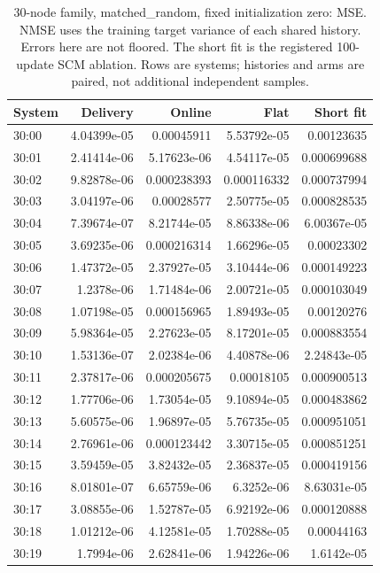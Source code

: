 \begin{table}[ht]
\centering\scriptsize
\begin{tabular}{lrrrr}
\toprule
System & Delivery & Online & Flat & Short fit\\
\midrule
30:00 & 4.04399e-05 & 0.00045911 & 5.53792e-05 & 0.00123635\\
30:01 & 2.41414e-06 & 5.17623e-06 & 4.54117e-05 & 0.000699688\\
30:02 & 9.82878e-06 & 0.000238393 & 0.000116332 & 0.000737994\\
30:03 & 3.04197e-06 & 0.00028577 & 2.50775e-05 & 0.000828535\\
30:04 & 7.39674e-07 & 8.21744e-05 & 8.86338e-06 & 6.00367e-05\\
30:05 & 3.69235e-06 & 0.000216314 & 1.66296e-05 & 0.00023302\\
30:06 & 1.47372e-05 & 2.37927e-05 & 3.10444e-06 & 0.000149223\\
30:07 & 1.2378e-06 & 1.71484e-06 & 2.00721e-05 & 0.000103049\\
30:08 & 1.07198e-05 & 0.000156965 & 1.89493e-05 & 0.00120276\\
30:09 & 5.98364e-05 & 2.27623e-05 & 8.17201e-05 & 0.000883554\\
30:10 & 1.53136e-07 & 2.02384e-06 & 4.40878e-06 & 2.24843e-05\\
30:11 & 2.37817e-06 & 0.000205675 & 0.00018105 & 0.000900513\\
30:12 & 1.77706e-06 & 1.73054e-05 & 9.10894e-05 & 0.000483862\\
30:13 & 5.60575e-06 & 1.96897e-05 & 5.76735e-05 & 0.000951051\\
30:14 & 2.76961e-06 & 0.000123442 & 3.30715e-05 & 0.000851251\\
30:15 & 3.59459e-05 & 3.82432e-05 & 2.36837e-05 & 0.000419156\\
30:16 & 8.01801e-07 & 6.65759e-06 & 6.3252e-06 & 8.63031e-05\\
30:17 & 3.08855e-06 & 1.52787e-05 & 6.92192e-06 & 0.000120888\\
30:18 & 1.01212e-06 & 4.12581e-05 & 1.70288e-05 & 0.00044163\\
30:19 & 1.7994e-06 & 2.62841e-06 & 1.94226e-06 & 1.6142e-05\\
\bottomrule
\end{tabular}
\caption{30-node family, matched\_random, fixed initialization zero: MSE. NMSE uses the training target variance of each shared history. Errors here are not floored. The short fit is the registered 100-update SCM ablation. Rows are systems; histories and arms are paired, not additional independent samples.}
\end{table}
